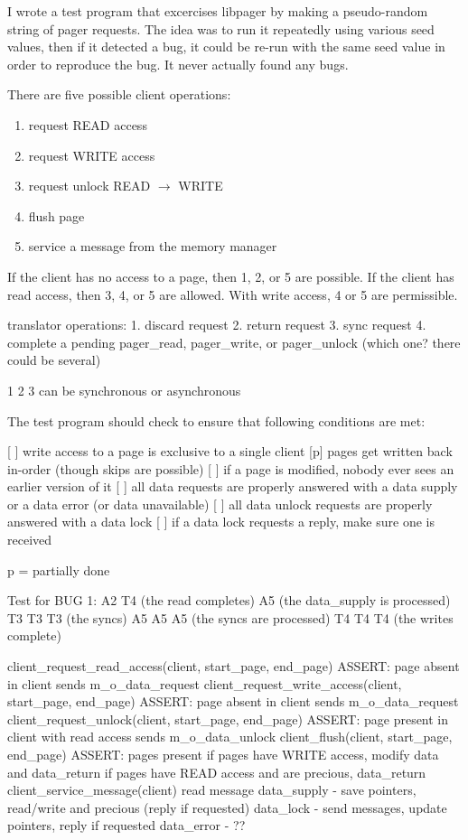 \documentclass{article}
\begin{document}
I wrote a test program that excercises libpager by making a
pseudo-random string of pager requests.  The idea was to run it
repeatedly using various seed values, then if it detected a bug, it
could be re-run with the same seed value in order to reproduce the
bug.  It never actually found any bugs.

There are five possible client operations:

\begin{enumerate}
\item request READ access
\item request WRITE access
\item request unlock READ $\to$ WRITE
\item flush page
\item service a message from the memory manager
\end{enumerate}

If the client has no access to a page, then 1, 2, or 5 are possible.
If the client has read access, then 3, 4, or 5 are allowed.  With
write access, 4 or 5 are permissible.

translator operations:
1. discard request
2. return request
3. sync request
4. complete a pending pager_read, pager_write, or pager_unlock (which one? there could be several)

1 2 3 can be synchronous or asynchronous

The test program should check to ensure that following conditions are met:

[ ] write access to a page is exclusive to a single client
[p] pages get written back in-order (though skips are possible)
[ ] if a page is modified, nobody ever sees an earlier version of it
[ ] all data requests are properly answered with a data supply or a data error (or data unavailable)
[ ] all data unlock requests are properly answered with a data lock
[ ] if a data lock requests a reply, make sure one is received

p = partially done

Test for BUG 1:
  A2 T4 (the read completes) A5 (the data_supply is processed)
    T3 T3 T3 (the syncs) A5 A5 A5 (the syncs are processed) T4 T4 T4 (the writes complete)

client_request_read_access(client, start_page, end_page)
  ASSERT: page absent in client
  sends m_o_data_request
client_request_write_access(client, start_page, end_page)
  ASSERT: page absent in client
  sends m_o_data_request
client_request_unlock(client, start_page, end_page)
  ASSERT: page present in client with read access
  sends m_o_data_unlock
client_flush(client, start_page, end_page)
  ASSERT: pages present
  if pages have WRITE access, modify data and data_return
  if pages have READ access and are precious, data_return
client_service_message(client)
  read message
  data_supply - save pointers, read/write and precious (reply if requested)
  data_lock - send messages, update pointers, reply if requested
  data_error - ??
\end{document}
